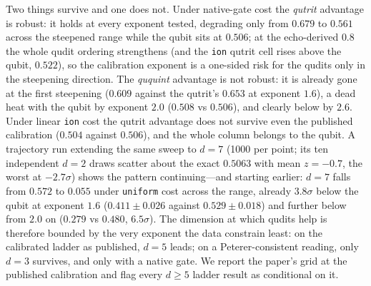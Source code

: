 \documentclass[aps,pra,reprint,superscriptaddress,nofootinbib,floatfix]{revtex4-2}
\begin{document}
Two things survive and one does not. Under native-gate cost the
\emph{qutrit} advantage is robust: it holds at every exponent tested,
degrading only from $0.679$ to $0.561$ across the steepened range
while the
qubit sits at $0.506$; at the echo-derived $0.8$ the whole qudit
ordering strengthens (and the \texttt{ion} qutrit cell rises above
the qubit, $0.522$), so the calibration exponent is a one-sided
risk for the qudits only in the steepening direction. The \emph{ququint} advantage is not robust: it
is already gone at the first steepening ($0.609$ against the qutrit's
$0.653$ at exponent $1.6$), a dead heat with the qubit by exponent
$2.0$ ($0.508$ vs $0.506$), and clearly below by
$2.6$. Under linear \texttt{ion} cost the qutrit advantage does not
survive even the published calibration ($0.504$ against $0.506$),
and the whole column belongs to the qubit. A trajectory run extending the
same sweep to $d=7$ (1000 per point; its ten independent $d=2$ draws
scatter about the exact $0.5063$ with mean $z=-0.7$, the worst at
$-2.7\sigma$) shows the pattern continuing---and starting
earlier: $d=7$
falls from $0.572$ to $0.055$ under \texttt{uniform} cost across the
range, already $3.8\sigma$ below the qubit at exponent $1.6$
($0.411\pm0.026$ against $0.529\pm0.018$) and further below from
$2.0$ on ($0.279$ vs $0.480$, $6.5\sigma$). The dimension
at which qudits help is therefore bounded by the very exponent the
data constrain least: on the calibrated ladder as published, $d=5$
leads; on a Peterer-consistent reading, only $d=3$ survives, and only
with a native gate. We report the paper's grid at the published
calibration and flag every $d\ge5$ ladder result as conditional on it.
\end{document}
